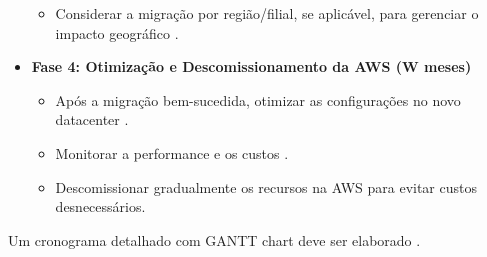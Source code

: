 \documentclass[
	12pt,				%
	oneside,			%
	a4paper,			%
	english,			%
	brazil				%
	]{abntex2unama}
\begin{document}
\begin{itemize}
\begin{itemize}
		      \item Considerar a migração por região/filial, se aplicável, para gerenciar o impacto geográfico \cite{edge_computing}.
	      \end{itemize}
	\item \textbf{Fase 4: Otimização e Descomissionamento da AWS (W meses)}
	      \begin{itemize}
		      \item Após a migração bem-sucedida, otimizar as configurações no novo datacenter \cite{capacity_planning}.
		      \item Monitorar a performance e os custos \cite{dcim_systems}.
		      \item Descomissionar gradualmente os recursos na AWS para evitar custos desnecessários.
	      \end{itemize}
\end{itemize}
Um cronograma detalhado com GANTT chart deve ser elaborado \cite{reliability_engineering}.
\end{document}
